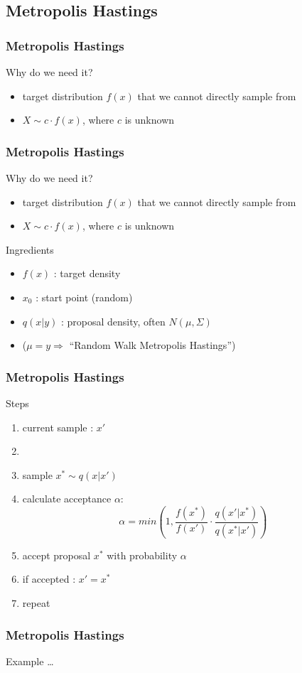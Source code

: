 
\subsection{Metropolis Hastings}


\begin{frame}
\frametitle{Metropolis Hastings}

\begin{block}{Why do we need it?}
\begin{itemize}
\item target distribution $f(x)$ that we cannot directly sample from
\item $X \sim c \cdot f(x)$, where $c$ is unknown
\end{itemize}
\end{block}

\end{frame}


\begin{frame}
\frametitle{Metropolis Hastings}

\begin{block}{Why do we need it?}
\begin{itemize}
\item target distribution $f(x)$ that we cannot directly sample from
\item $X \sim c \cdot f(x)$, where $c$ is unknown
\end{itemize}
\end{block}

\begin{block}{Ingredients}
\begin{itemize}
\item $f(x)$ : target density
\item $x_0$ : start point (random)
\item $q(x|y)$ : proposal density, often $N(\mu, \Sigma)$ \\
\item[] \quad \quad  \quad  \quad  ($\mu = y \Rightarrow$ ``Random Walk
Metropolis Hastings'')
\end{itemize}
\end{block}

\end{frame}

\begin{frame}
\frametitle{Metropolis Hastings}

\begin{block}{Steps}
\begin{enumerate}
  \item current sample : $x'$
  \item[]
\item sample $x^* \sim q(x | x')$
\item calculate acceptance $\alpha$:
\[\alpha = min\left(1, \frac{f(x^*)}{f(x')} \cdot
\frac{q(x'|x^*)}{q(x^*|x')} \right)\]

\item accept proposal $x^*$ with probability $\alpha$
\item if accepted : $x' = x^*$
\item repeat
\end{enumerate}
\end{block}
\end{frame}


\begin{frame}
\frametitle{Metropolis Hastings}
Example \ldots
\end{frame}